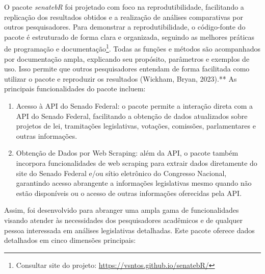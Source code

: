 \documentclass{article}
\begin{document}
O pacote \emph{senatebR} foi projetado com foco na reprodutibilidade,
facilitando a replicação dos resultados obtidos e a realização de
análises comparativas por outros pesquisadores. Para demonstrar a
reprodutibilidade, o código-fonte do pacote é estruturado de forma clara
e organizada, seguindo as melhores práticas de programação e
documentação\footnote{Consultar site do projeto:
  \url{https://vsntos.github.io/senatebR/}}. Todas as funções e métodos
são acompanhados por documentação ampla, explicando seu propósito,
parâmetros e exemplos de uso. Isso permite que outros pesquisadores
entendam de forma facilitada como utilizar o pacote e reproduzir os
resultados (Wickham, Bryan, 2023).** As principais funcionalidades do
pacote incluem:

\begin{enumerate}
\def\labelenumi{\Roman{enumi})}
\item
  Acesso à API do Senado Federal: o pacote permite a interação direta
  com a API do Senado Federal, facilitando a obtenção de dados
  atualizados sobre projetos de lei, tramitações legislativas, votações,
  comissões, parlamentares e outras informações.
\item
  Obtenção de Dados por Web Scraping: além da API, o pacote também
  incorpora funcionalidades de web scraping para extrair dados
  diretamente do site do Senado Federal e/ou sítio eletrônico do
  Congresso Nacional, garantindo acesso abrangente a informações
  legislativas mesmo quando não estão disponíveis ou o acesso de outras
  informações oferecidas pela API.
\end{enumerate}

Assim, foi desenvolvido para abranger uma ampla gama de funcionalidades
visando atender às necessidades dos pesquisadores acadêmicos e de
qualquer pessoa interessada em análises legislativas detalhadas. Este
pacote oferece dados detalhados em cinco dimensões principais:
\end{document}
